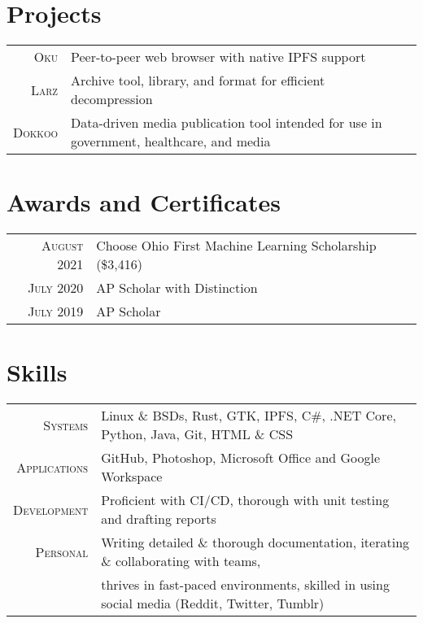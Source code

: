 \documentclass[a4paper,10pt]{article} %
\begin{document}

\section{Projects}

\begin{tabular}{rl}
\textsc{Oku} & Peer-to-peer web browser with native IPFS support\\
\textsc{Larz} & Archive tool, library, and format for efficient decompression\\
\textsc{Dokkoo} & Data-driven media publication tool intended for use in government, healthcare, and media\\
\end{tabular}


\section{Awards and Certificates}

\begin{tabular}{rl}
\textsc{August 2021} & Choose Ohio First Machine Learning Scholarship \footnotesize(\$3,416)\normalsize\\
\textsc{July 2020} & AP Scholar with Distinction\\
\textsc{July 2019} & AP Scholar\\
\end{tabular}


\section{Skills}

\begin{tabular}{rl}
\textsc{Systems} & Linux \& BSDs, Rust, GTK, IPFS, C\#, .NET Core, Python, Java, Git, HTML \& CSS\\
\textsc{Applications} & GitHub, Photoshop, Microsoft Office and Google Workspace\\
\textsc{Development} & Proficient with CI/CD, thorough with unit testing and drafting reports\\
\textsc{Personal} & Writing detailed \& thorough documentation, iterating \& collaborating with teams,\\& thrives in fast-paced environments, skilled in using social media \footnotesize(Reddit, Twitter, Tumblr)\normalsize\\

\end{tabular}
\end{document}
